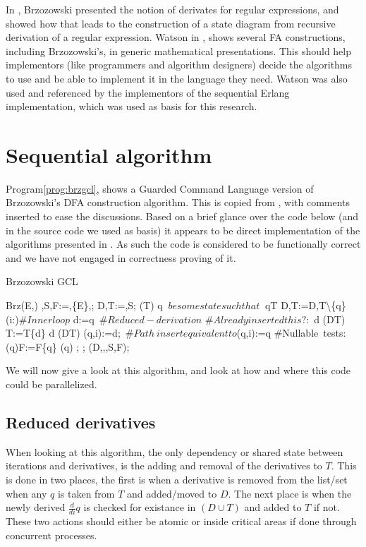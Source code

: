 \documentclass[a4paper,11pt]{report}
\begin{document}
In \cite{brzozowski1964derivatives}, Brzozowski presented the notion
of derivates for regular expressions, and showed how that leads to the
construction of a state diagram from recursive derivation of a regular
expression.  Watson in \cite{watson1995taxonomies}, shows several FA
constructions, including Brzozowski's, in generic mathematical
presentations. This should help implementors (like programmers and
algorithm designers) decide the algorithms to use and be able to
implement it in the language they need. Watson was also used and
referenced by the implementors of the sequential Erlang
implementation, which was used as basis for this research.

\section{Sequential algorithm}
\label{sec:seq-algo}

Program\ref{prog:brzgcl}, shows a Guarded Command Language version of
Brzozowski's DFA construction algorithm. This is copied from
\cite{strauss2008concurrent}, with comments inserted to ease the
discussions. Based on a brief glance over the code below (and in the
source code we used as basis) it appears to be direct
implementation of the algorithms presented in
\cite{watson1995taxonomies}. As such the code is considered to be
functionally correct and we have not engaged in correctness proving
of it. \begin{Program}[thf]
\caption{Brzozowski GCL 
\cite{strauss2008concurrent}}\label{prog:brzgcl}
\begin{gcl}
\FUNC Brz(E,\Sigma)\ARROW
\delta,S,F:=\emptyset,\{E\},\emptyset;
D,T:=\emptyset,S;
\DO (T\neq \emptyset) \ARROW
\LET q $\ be some state such that\ $ q\in T
D,T:=D,T\backslash \{q\}
\FOR (i:\Sigma)\ARROW $\#Inner loop$
d:=q\ $\#Reduced-derivation$
$\#Already inserted this $$?:$
\IF d \notin (D\cup T) \ARROW T:=T\cup\{d\}
\BAR d \in (D\cup T) \ARROW \SKIP
\FI
\delta(q,i):=d;\ $\#Path\ insert equivalent to $\delta(q,i):=q
\ROF
\#Nullable\ tests:
\IF \epsilon\in {}(q)\ARROW F:=F\cup\{q\}
\BAR \epsilon\notin {}(q)\ARROW \SKIP
\FI;
\OD;
\RETURN(D,\Sigma,\delta,S,F);
\end{gcl}
\end{Program}

We will now give a look at this algorithm, and look at how and where
this code could be parallelized.

\subsection{Reduced derivatives}
\label{sec:brzredder}
When looking at this algorithm, the only dependency or shared state
between iterations and derivatives, is the adding and removal of the
derivatives to $T$. This is done in two places, the first is when a
derivative is removed from the list/set when any $q$ is taken from $T$
and added/moved to $D$. The next place is when the newly derived
$\frac{d}{di}q$ is checked for existance in $(D\cup T)$ and added to
$T$ if not. These two actions should either be atomic or inside
critical areas if done through concurrent processes.
\end{document}
